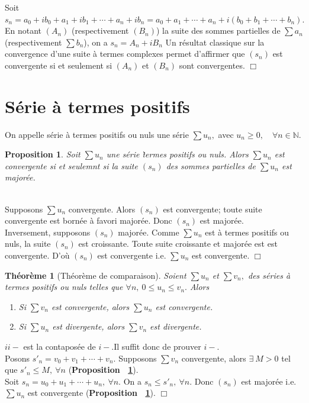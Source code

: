 \documentclass[11pt, a4paper]{book}
\newtheorem{teo}{Th\'eor\`eme}[section]
\newtheorem{pro}{Proposition}[section]
\newenvironment{pr}{\noindent {\bf Preuve} \noindent} {\hfill $\Box$\vskip 5mm}
\begin{document}
\begin{pr}\quad
Soit $s_{n}=a_{0}+ib_{0}+a_{1}+ib_{1}+\cdots+a_{n}+ib_{n}=a_{0}+a_{1}+\cdots+a_{n}+i(b_{0}+b_{1}+\cdots+b_{n}).$ En notant $(A_{n})$ (respectivement $(B_{n})$) la suite des sommes partielles de $\sum a_{n}$ (respectivement $\sum b_{n}$), on a $s_{n}=A_{n}+iB_{n}$ 
Un r\'esultat classique sur la convergence d'une suite \`a termes complexes permet d'affirmer que $(s_{n})$ est convergente si et seulement si $(A_{n})$ et $(B_{n})$ sont convergentes.
\end{pr}

\section{S\'erie \`a termes positifs}
On appelle s\'erie \`a termes positifs ou nuls une s\'erie $\sum u_{n},$ avec $u_{n}\geq0,\quad \forall n \in \mathbb{N}.$
\begin{pro} \label{pro1}
 Soit $\sum u_{n}$ une s\'erie \`termes positifs ou nuls. Alors $\sum u_{n}$ est convergente si et seulemnt si la suite $(s_{n})$ des sommes partielles de $\sum u_{n}$ est major\'ee. \end{pro}
\begin{pr}\\ Supposons $\sum u_{n}$ convergente. Alors $(s_{n})$ est convergente; toute suite convergente est born\'ee \`a favori major\'ee. Donc $(s_{n})$ est major\'ee.\\
Inversement, supposons $(s_{n})$ major\'ee. Comme $\sum u_{n}$ est \`a termes positifs ou nuls, la suite $(s_{n})$ est croissante. Toute suite croissante et major\'ee est est convergente. D'o\`u $(s_{n})$ est convergente i.e. $\sum u_{n}$ est convergente.
\end{pr}
\begin{teo}[Th\'eor\`eme de comparaison] \label{teo1}
 Soient $\sum u_{n}$ et $\sum v_{n},$ des s\'eries \`a termes positifs ou nuls telles que $\forall n,~0\leq u_{n}\leq v_{n}.$ Alors \begin{enumerate}
\item[i-] Si $\sum v_{n}$ est convergente, alors $\sum u_{n}$ est convergente.
\item[ii-]   Si $\sum u_{n}$ est divergente, alors $\sum v_{n}$ est divergente.
\end{enumerate} \end{teo}
\begin{pr}\quad $ii-$ est la contapos\'ee de $i-$.Il suffit donc de prouver $i-$. \\ Posons $s'_{n}=v_{0}+v_{1}+\cdots+v_{n}.$ Supposons $\sum v_{n}$ convergente, alors $ \exists ~M>0$ tel que $ s'_{n}\leq M, ~\forall n$ (\textbf{Proposition ~\ref{pro1}}).  \\ Soit $s_{n}=u_{0}+u_{1}+\cdots+u_{n}, ~\forall n.$ On a $s_{n}\leq s'_{n}, ~\forall n.$ Donc $(s_{n})$ est major\'ee i.e. $\sum u_{n}$ est convergente (\textbf{Proposition ~\ref{pro1}}).
\end{pr}
\end{document}
